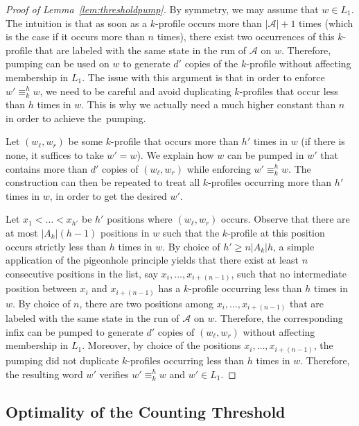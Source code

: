 \documentclass{LMCS}
\newcommand\As{\ensuremath{\mathcal{A}}\xspace}
\newcommand\profile[1]{$#1$-profile\xspace}
\newcommand\profiles[1]{$#1$-profiles\xspace}
\newcommand\kprofile{\profile{k}}
\newcommand\kprofiles{\profiles{k}}
\newcommand\ltteq[2]{\ensuremath{\equiv_{#1}^{#2}}\xspace}
\let\geq\geqslant
\theoremstyle{plain}
\begin{document}
\begin{proof}[Proof of Lemma~\ref{lem:thresholdpump}]
  By symmetry, we may assume that $w \in L_1$.
  The intuition is that as soon as a \kprofile occurs more than
  $|\As|+1$ times (which is the case if it occurs more than $n$ times),
  there exist two occurrences of this \kprofile that are labeled with
  the same state in the run of $\As$ on $w$. Therefore, pumping
  can be used on $w$ to generate $d'$ copies of the \kprofile
  without affecting membership in $L_1$. The issue with this argument
  is that in order to enforce $w' \ltteq{k}{h} w$, we need to be
  careful and avoid duplicating \kprofiles that occur less than $h$
  times in $w$. This is why we actually need a much higher constant
  than $n$ in order to achieve the~pumping.

  Let $(w_\ell,w_r)$ be some \kprofile that occurs more than $h'$
  times in $w$ (if there is none, it suffices to take $w'=w$). We
  explain how $w$ can be pumped in $w'$ that contains more than $d'$
  copies of $(w_\ell,w_r)$ while enforcing $w' \ltteq{k}{h} w$. The
  construction can then be repeated to treat all \kprofiles occurring
  more than $h'$ times in $w$, in order to get the desired $w'$.

  Let $x_1 < \dots < x_{h'}$ be $h'$ positions where $(w_\ell,w_r)$
  occurs. Observe that there are at most $|A_k|(h-1)$ positions in $w$
  such that the \kprofile at this position occurs strictly less than
  $h$ times in $w$. By choice of $h'\geq n|A_k|h$, a simple application of the
  pigeonhole principle yields that there exist at least $n$
  consecutive positions in the list, say $x_i,\dots,x_{i+(n-1)}$, such
  that no intermediate position between $x_i$ and $x_{i+(n-1)}$ has a
  \kprofile occurring less than $h$ times in $w$. By choice of $n$,
  there are two positions among $x_i, \dots, x_{i+(n-1)}$ that are
  labeled with the same state in the run of $\As$ on
  $w$. Therefore, the corresponding infix can be pumped to generate
  $d'$ copies of $(w_\ell,w_r)$ without affecting membership in
  $L_1$. Moreover, by choice of the positions $x_i,\dots,x_{i+(n-1)}$,
  the pumping did not duplicate \kprofiles occurring less than $h$
  times in $w$. Therefore, the resulting word $w'$ verifies
  $w'\ltteq{k}{h} w$ and $w' \in L_1$.
\end{proof}




\subsection{Optimality of the Counting Threshold}
\label{sec:append-sect-ltt}
\end{document}
